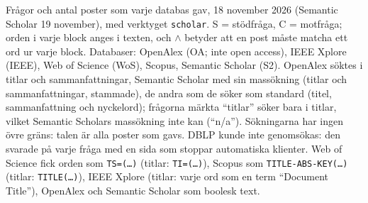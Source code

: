 \begin{table}[htbp]
  \begin{sidecaption}{%
    {Frågor och antal poster som varje databas gav, 18 november 2026
    (Semantic Scholar 19 november), med verktyget \texttt{scholar}.  S =
    stödfråga, C = motfråga; orden i varje block anges i texten, och
    $\wedge$ betyder att en post måste matcha ett ord ur varje block.
    Databaser: OpenAlex (OA; inte open access), IEEE Xplore (IEEE), Web
    of Science (WoS), Scopus, Semantic Scholar (S2).  OpenAlex söktes i
    titlar och sammanfattningar, Semantic Scholar med sin massökning
    (titlar och sammanfattningar, stammade), de andra som de söker som
    standard (titel, sammanfattning och nyckelord); frågorna märkta
    \enquote{titlar} söker bara i titlar, vilket Semantic Scholars
    massökning inte kan (\enquote{n/a}).  Sökningarna har ingen övre
    gräns: talen är alla poster som gavs.  DBLP kunde inte genomsökas:
    den svarade på varje fråga med en sida som stoppar automatiska
    klienter.  Web of Science fick orden som \texttt{TS=(\dots)} (titlar:
    \texttt{TI=(\dots)}), Scopus som \texttt{TITLE-ABS-KEY(\dots)}
    (titlar: \texttt{TITLE(\dots)}), IEEE Xplore (titlar: varje ord som
    en term \enquote{Document Title}), OpenAlex och Semantic Scholar som
    boolesk text.}%
}
\end{sidecaption}
\end{table}
